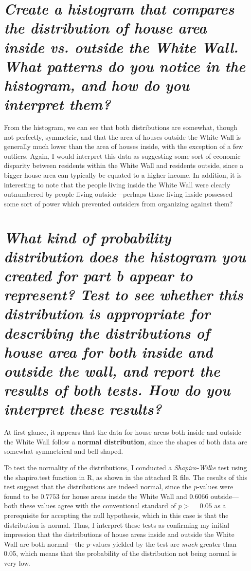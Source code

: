 \documentclass[answers]{exam}
\begin{document}
\begin{parts}
\part{\textit{Create a histogram that compares the distribution of house area inside vs. outside the White Wall. What patterns do you notice in the histogram, and how do you interpret them?}}
\begin{center}
  \end{center}\color{nr}
\quad\quad From the histogram, we can see that both distributions are somewhat, though not perfectly, symmetric, and that the area of houses outside the White Wall is generally much lower than the area of houses inside, with the exception of a few outliers. Again, I would interpret this data as suggesting some sort of economic disparity between residents within the White Wall and residents outside, since a bigger house area can typically be equated to a higher income. In addition, it is interesting to note that the people living inside the White Wall were clearly outnumbered by people living outside---perhaps those living inside possessed some sort of power which prevented outsiders from organizing against them?
\color{black}
\part{\textit{What kind of probability distribution does the histogram you created for part b appear to represent? Test to see whether this distribution is appropriate for describing the distributions of house area for both inside and outside the wall, and report the results of both tests. How do you interpret these results?}}
 \color{nr}

\quad\quad At first glance, it appears that the data for house areas both inside and outside the White Wall follow a \textbf{normal distribution}, since the shapes of both data are somewhat symmetrical and bell-shaped.

\quad\quad To test the normality of the distributions, I conducted a \textit{Shapiro-Wilke} test using the shapiro.test function in R, as shown in the attached R file. The results of this test suggest that the distributions are indeed normal, since the $p$-values were found to be $0.7753$ for house areas inside the White Wall and $0.6066$ outside---both these values agree with the conventional standard of $p >= 0.05$ as a prerequisite for accepting the null hypothesis, which in this case is that the distribution is normal. Thus, I interpret these tests as confirming my initial impression that the distributions of house areas inside and outside the White Wall are both normal---the $p$-values yielded by the test are \textit{much} greater than 0.05, which means that the probability of the distribution not being normal is very low.
\color{black}

\end{parts}
\end{document}
